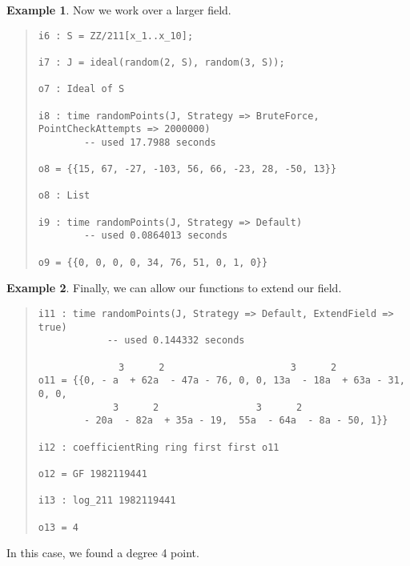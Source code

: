 \documentclass[11pt]{amsart}
\theoremstyle{definition}
\newtheorem{example}{Example}[section]
\begin{document}
\begin{example}
    Now we work over a larger field.
    {{\small\color{blue}
    \begin{quote}
\begin{verbatim}
i6 : S = ZZ/211[x_1..x_10];

i7 : J = ideal(random(2, S), random(3, S));

o7 : Ideal of S

i8 : time randomPoints(J, Strategy => BruteForce, PointCheckAttempts => 2000000)
        -- used 17.7988 seconds
                   
o8 = {{15, 67, -27, -103, 56, 66, -23, 28, -50, 13}}

o8 : List

i9 : time randomPoints(J, Strategy => Default)
        -- used 0.0864013 seconds         

o9 = {{0, 0, 0, 0, 34, 76, 51, 0, 1, 0}}
    \end{verbatim}
\end{quote}\vspace{-2em}
        }}
    \end{example}

\begin{example}
        Finally, we can allow our functions to extend our field.
        {{\small\color{blue}
        \begin{quote}
            {\small
\begin{verbatim}
i11 : time randomPoints(J, Strategy => Default, ExtendField => true)
            -- used 0.144332 seconds              
       
              3      2                      3      2                        
o11 = {{0, - a  + 62a  - 47a - 76, 0, 0, 13a  - 18a  + 63a - 31, 0, 0, 
             3      2                 3      2
        - 20a  - 82a  + 35a - 19,  55a  - 64a  - 8a - 50, 1}}

i12 : coefficientRing ring first first o11

o12 = GF 1982119441       

i13 : log_211 1982119441

o13 = 4
\end{verbatim}
            }
    \end{quote}
        }}
In this case, we found a degree 4 point.
    \end{example}
\end{document}
